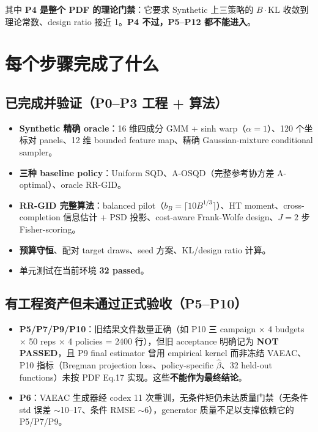 \documentclass[11pt,a4paper]{ctexart}
\begin{document}
其中 \textbf{P4 是整个 PDF 的理论门禁}：它要求 Synthetic 上三策略的 $B\cdot\mathrm{KL}$ 收敛到理论常数、design ratio 接近 1。\textbf{P4 不过，P5--P12 都不能进入}。

\section{每个步骤完成了什么}

\subsection{已完成并验证（P0--P3 工程 + 算法）}
\begin{itemize}
  \item \textbf{Synthetic 精确 oracle}：16 维四成分 GMM + sinh warp（$\alpha=1$）、120 个坐标对 panels、12 维 bounded feature map、精确 Gaussian-mixture conditional sampler。
  \item \textbf{三种 baseline policy}：Uniform SQD、A-OSQD（完整参考协方差 A-optimal）、oracle RR-GID。
  \item \textbf{RR-GID 完整算法}：balanced pilot（$b_B=\lceil 10B^{1/3}\rceil$）、HT moment、cross-completion 信息估计 + PSD 投影、cost-aware Frank-Wolfe design、$J=2$ 步 Fisher-scoring。
  \item \textbf{预算守恒}、配对 target draws、seed 方案、KL/design ratio 计算。
  \item 单元测试在当前环境 \textbf{32 passed}。
\end{itemize}

\subsection{有工程资产但未通过正式验收（P5--P10）}
\begin{itemize}
  \item \textbf{P5/P7/P9/P10}：旧结果文件数量正确（如 P10 三 campaign $\times$ 4 budgets $\times$ 50 reps $\times$ 4 policies = 2400 行），但旧 acceptance 明确记为 \textcolor{pred}{\textbf{NOT PASSED}}，且 P9 final estimator 曾用 empirical kernel 而非冻结 VAEAC、P10 指标（Bregman projection loss、policy-specific $\hat{\beta}$、32 held-out functions）未按 PDF Eq.17 实现。这些\textbf{不能作为最终结论}。
  \item \textbf{P6}：VAEAC 生成器经 codex 11 次重训，无条件矩仍未达质量门禁（无条件 std 误差 $\sim$10--17、条件 RMSE $\sim$6），generator 质量不足以支撑依赖它的 P5/P7/P9。
\end{itemize}
\end{document}

